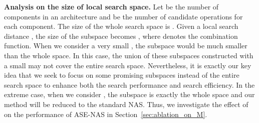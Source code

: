 \documentclass[lettersize,journal]{IEEEtran}
\newcommand{\sexyname}{ASE-NAS\xspace}
\begin{document}
\textbf{Analysis on the size of local search space.}
Let  be the number of components in an architecture and  be the number of candidate operations for each component.
The size of the whole search space is .
Given a local search distance , the size of the subspace becomes , where  denotes the combination function. 
When we consider a very small , the subspace would be much smaller than the whole space. In this case, the union of these subspaces constructed with a small  may not cover the entire search space.
Nevertheless, it is exactly our key idea that we seek to focus on some promising subspaces instead of the entire search space to enhance both the search performance and search efficiency.
In the extreme case, when we consider , the subspace is exactly the whole space and our method will be reduced to the standard NAS.
Thus, we investigate the effect of  on the performance of \sexyname in Section~\ref{sec:ablation_on_M}.
\end{document}
